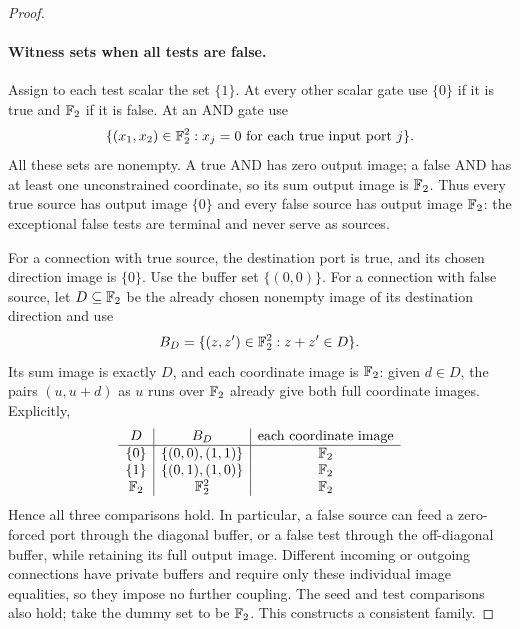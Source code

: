 \begin{proof}
\paragraph{Witness sets when all tests are false.}
Assign to each test scalar the set $\{1\}$. At every other scalar gate
use $\{0\}$ if it is true and $\mathbb F_2$ if it is false. At an AND gate use
\begin{equation}\label{eq:consistency-and-witness}
 \{(x_1,x_2)\in\mathbb F_2^2:
       x_j=0\text{ for each true input port }j\}.
\end{equation}
All these sets are nonempty. A true AND has zero output image; a false
AND has at least one unconstrained coordinate, so its sum output image
is $\mathbb F_2$. Thus every true source has output image $\{0\}$ and every
false source has output image $\mathbb F_2$: the exceptional false tests are
terminal and never serve as sources.

For a connection with true source, the destination port is true, and its
chosen direction image is $\{0\}$. Use the buffer set $\{(0,0)\}$.
For a connection with false source, let $D\subseteq\mathbb F_2$ be the already
chosen nonempty image of its destination direction and use
\begin{equation}\label{eq:consistency-fiber}
 B_D=\{(z,z')\in\mathbb F_2^2:z+z'\in D\}.
\end{equation}
Its sum image is exactly $D$, and each coordinate image is $\mathbb F_2$:
given $d\in D$, the pairs $(u,u+d)$ as $u$ runs over $\mathbb F_2$ already
give both full coordinate images. Explicitly,
\[
\begin{array}{c|c|c}
 D & B_D & \text{each coordinate image}\\ \hline
 \{0\} & \{(0,0),(1,1)\} & \mathbb F_2\\
 \{1\} & \{(0,1),(1,0)\} & \mathbb F_2\\
 \mathbb F_2 & \mathbb F_2^2 & \mathbb F_2
\end{array}
\]
Hence all three comparisons hold. In particular, a false source can feed
a zero-forced port through the diagonal buffer, or a false test through
the off-diagonal buffer, while retaining its full output image. Different
incoming or outgoing connections have private buffers and require only
these individual image equalities, so they impose no further coupling.
The seed and test comparisons also hold; take the dummy set to be $\mathbb F_2$.
This constructs a consistent family.


\end{proof}
